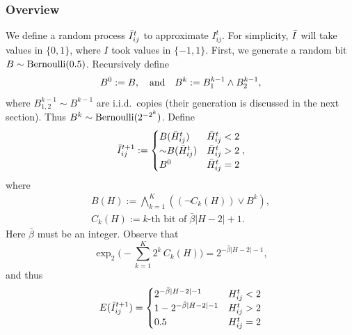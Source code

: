 \subsubsection{Overview}
We define a random process $\bar{I}_{ij}^t$ to approximate $I_{ij}^t$.  For simplicity,
$\bar{I}$ will take values in $\{0,1\}$, where $I$ took values in $\{-1,1\}$.
First, we generate a random bit $B \sim \operatorname{Bernoulli}(0.5)$. Recursively define
\begin{equation}
B^0 := B,\quad\text{and}\quad B^k := B^{k-1}_1\wedge B^{k-1}_2 ,
\end{equation}
where $B^{k-1}_{1,2} \sim B^{k-1}$ are i.i.d.\ copies (their generation is discussed in the next section).
Thus $B^k \sim \operatorname{Bernoulli}(2^{-2^k})$.
Define
\begin{equation}
 \bar{I}^{t+1}_{ij} := \begin{cases}
B(\bar H_{ij}^t) & \bar H_{ij}^t<2\\
\mathord{\sim} B(\bar H_{ij}^t) & \bar H_{ij}^t>2\\
B^0 & \bar H_{ij}^t=2
\end{cases},
\end{equation}
where
\begin{gather}
B(H) := \bigwedge_{k=1}^K((\neg C_k(H))\vee B^k),\\
C_k(H) := \text{$k$-th bit of}\; \bar{\beta}|H-2|+1.
\end{gather}
Here $\bar\beta$ must be an integer. Observe that 
$$\exp_2\bigl(-\sum_{k=1}^K 2^k\,C_k(H)\bigr) =  2^{-\bar\beta |H-2|-1},$$
and thus
\begin{equation}
E(\bar{I}^{t+1}_{ij}) = 
\begin{cases}
2^{-\bar\beta |H-2|-1} & H_{ij}^t < 2\\
1-2^{-\bar\beta |H-2|-1} & H_{ij}^t > 2\\
0.5 & H_{ij}^t = 2
\end{cases}
\end{equation}

